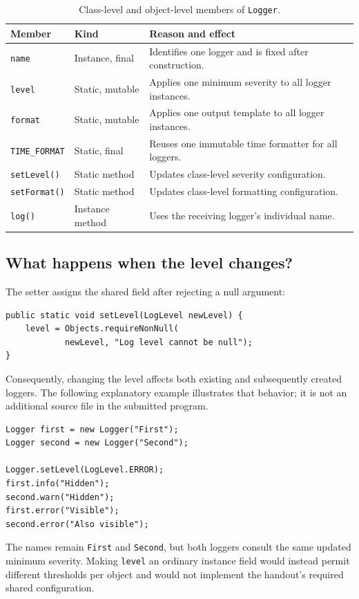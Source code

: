 \documentclass[12pt,a4paper]{article}
\newcommand{\code}[1]{\texttt{#1}}
\begin{document}
\begin{table}[H]
\centering\small
\begin{tabularx}{\textwidth}{@{}p{}p{}Y@{}}
\toprule
\textbf{Member} & \textbf{Kind} & \textbf{Reason and effect}\\
\midrule
\code{name} & Instance, final & Identifies one logger and is fixed after construction.\\
\code{level} & Static, mutable & Applies one minimum severity to all logger instances.\\
\code{format} & Static, mutable & Applies one output template to all logger instances.\\
\code{TIME\_FORMAT} & Static, final & Reuses one immutable time formatter for all loggers.\\
\code{setLevel()} & Static method & Updates class-level severity configuration.\\
\code{setFormat()} & Static method & Updates class-level formatting configuration.\\
\code{log()} & Instance method & Uses the receiving logger's individual name.\\
\bottomrule
\end{tabularx}
\caption{Class-level and object-level members of \code{Logger}.}
\end{table}

\begin{samepage}
\begin{samepage}
\subsection{What happens when the level changes?}
The setter assigns the shared field after rejecting a null argument:
\begin{lstlisting}
public static void setLevel(LogLevel newLevel) {
    level = Objects.requireNonNull(
            newLevel, "Log level cannot be null");
}
\end{lstlisting}
\end{samepage}
Consequently, changing the level affects both existing and subsequently created loggers. The following explanatory example illustrates that behavior; it is not an additional source file in the submitted program.
\begin{lstlisting}
Logger first = new Logger("First");
Logger second = new Logger("Second");

Logger.setLevel(LogLevel.ERROR);
first.info("Hidden");
second.warn("Hidden");
first.error("Visible");
second.error("Also visible");
\end{lstlisting}
\end{samepage}
The names remain \code{First} and \code{Second}, but both loggers consult the same updated minimum severity. Making \code{level} an ordinary instance field would instead permit different thresholds per object and would not implement the handout's required shared configuration.
\end{document}
